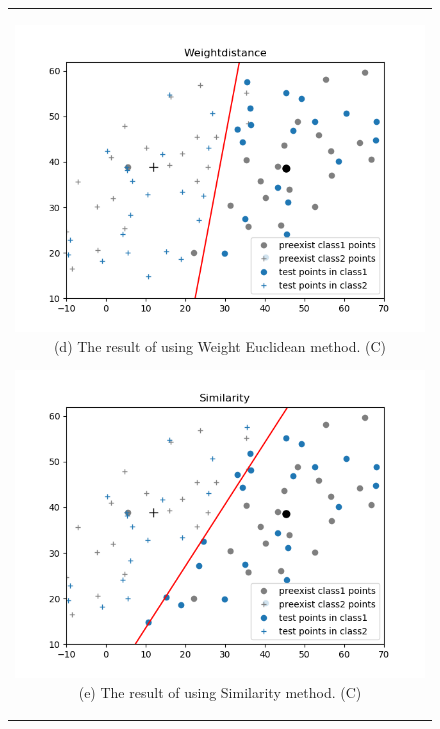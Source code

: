 \documentclass[10.5pt]{jsarticle}
\begin{document}
 \begin{figure}[htbp]
   \centering
   \begin{tabular}{c}
   	\begin{minipage}{0.56\hsize}
   	\centering
   		\includegraphics[width=15.0cm, bb=9 9 700 270]{results/WeightdistanceResultFigureC.png}
   		\hspace{0cm} (d) The result of using Weight Euclidean method. (C)
   	\end{minipage}

   	\begin{minipage}{0.5\hsize}
   	\centering
   		\includegraphics[width=15.0cm, bb=9 9 700 270]{results/SimilarityResultFigureC.png}
   		\hspace{0cm} (e) The result of using Similarity method. (C)
   	\end{minipage}
   \end{tabular}
 \end{figure}
\end{document}
